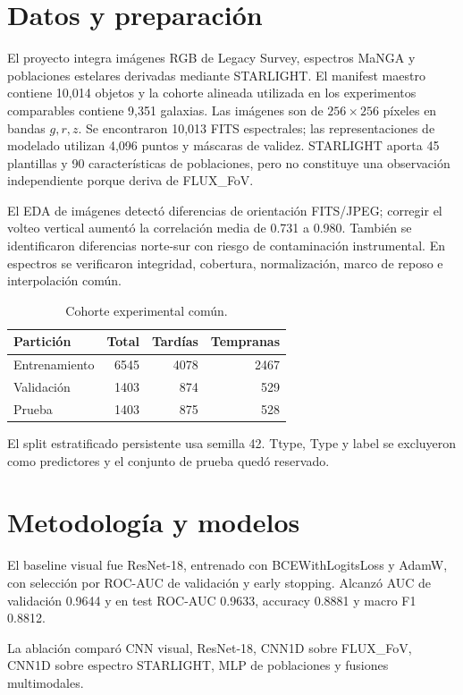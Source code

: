 \documentclass[letterpaper,11pt]{article}
\begin{document}
\section{Datos y preparación}
El proyecto integra imágenes RGB de Legacy Survey, espectros MaNGA y poblaciones estelares derivadas mediante STARLIGHT. El manifest maestro contiene 10,014 objetos y la cohorte alineada utilizada en los experimentos comparables contiene 9,351 galaxias. Las imágenes son de $256\times256$ píxeles en bandas $g,r,z$. Se encontraron 10,013 FITS espectrales; las representaciones de modelado utilizan 4,096 puntos y máscaras de validez. STARLIGHT aporta 45 plantillas y 90 características de poblaciones, pero no constituye una observación independiente porque deriva de FLUX\_FoV.

El EDA de imágenes detectó diferencias de orientación FITS/JPEG; corregir el volteo vertical aumentó la correlación media de 0.731 a 0.980. También se identificaron diferencias norte-sur con riesgo de contaminación instrumental. En espectros se verificaron integridad, cobertura, normalización, marco de reposo e interpolación común.

\begin{table}[H]\centering
\caption{Cohorte experimental común.}\label{tab:cohorte}
\begin{tabular}{lrrr}\toprule
Partición & Total & Tardías & Tempranas\\\midrule
Entrenamiento & 6545 & 4078 & 2467\\
Validación & 1403 & 874 & 529\\
Prueba & 1403 & 875 & 528\\\bottomrule
\end{tabular}\end{table}

El split estratificado persistente usa semilla 42. Ttype, Type y label se excluyeron como predictores y el conjunto de prueba quedó reservado.

\section{Metodología y modelos}
El baseline visual fue ResNet-18, entrenado con BCEWithLogitsLoss y AdamW, con selección por ROC-AUC de validación y early stopping. Alcanzó AUC de validación 0.9644 y en test ROC-AUC 0.9633, accuracy 0.8881 y macro F1 0.8812.

La ablación comparó CNN visual, ResNet-18, CNN1D sobre FLUX\_FoV, CNN1D sobre espectro STARLIGHT, MLP de poblaciones y fusiones multimodales.
\end{document}
